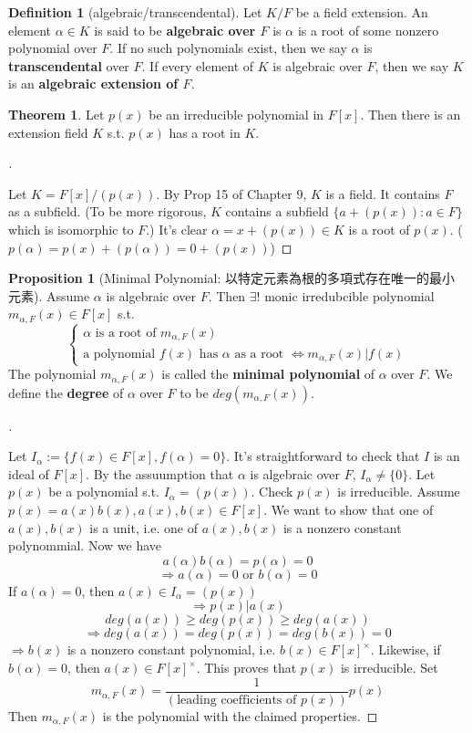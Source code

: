 \documentclass{article}
\theoremstyle{definition}
\newtheorem{thm}{Theorem}
\newtheorem{dfn}{Definition}
\newtheorem{prop}{Proposition}
\newenvironment{proofs}[1][\proofname]{%
  \begin{proof}[#1]$ $\par\nobreak\ignorespaces
}{%
  \end{proof}
}
\begin{document}
\begin{dfn}[algebraic/transcendental]
	Let $K/F$ be a field extension. An element $\alpha \in K$ is said to be \textbf{algebraic over $F$} is $\alpha$ is a root of some nonzero polynomial over $F$.
	If no such polynomials exist, then we say $\alpha$ is \textbf{transcendental} over $F$.
	If every element of $K$ is algebraic over $F$, then we say $K$ is an \textbf{algebraic extension of $F$}.
\end{dfn}

\begin{thm}
	Let $p(x)$ be an irreducible polynomial in $F[x]$. Then there is an extension field $K$ s.t. $p(x)$ has a root in $K$.
\end{thm}

\begin{proofs}
	Let $K = F[x]/(p(x))$.
	By Prop 15 of Chapter 9, $K$ is a field.
	It contains $F$ as a subfield.
	(To be more rigorous, $K$ contains a subfield $\{a + (p(x)): a \in F\}$ which is isomorphic to $F$.)
	It's clear $\alpha = x + (p(x)) \in K$ is a root of $p(x)$.
	($p(\alpha) = p(x) + (p(\alpha)) = 0 + (p(x))$)
\end{proofs}

\begin{prop}[Minimal Polynomial: 以特定元素為根的多項式存在唯一的最小元素]
	Assume $\alpha$ is algebraic over $F$.
	Then $\exists !$ monic irredubcible polynomial $m_{\alpha, F}(x) \in F[x]$ s.t.
	\[
		\begin{cases}
			\alpha \text{ is a root of } m_{\alpha, F}(x) \\
			\text{a polynomial } f(x) \text{ has } \alpha \text{ as a root } \Leftrightarrow m_{\alpha, F}(x) | f(x)
		\end{cases}
	\]
	The polynomial $m_{\alpha, F}(x)$ is called the \textbf{minimal polynomial} of $\alpha$ over $F$.
	We define the \textbf{degree} of $\alpha$ over $F$ to be $deg(m_{\alpha, F}(x))$.
\end{prop}

\begin{proofs}
	Let $I_\alpha := \{f(x) \in F[x], f(\alpha) = 0\}$.
	It's straightforward to check that $I$ is an ideal of $F[x]$.
	By the assuumption that $\alpha$ is algebraic over $F$, $I_\alpha \neq \{0\}$.
	Let $p(x)$ be a polynomial s.t. $I_\alpha = (p(x))$.
	Check $p(x)$ is irreducible.
	Assume $p(x) = a(x) b(x), a(x), b(x) \in F[x]$.
	We want to show that one of $a(x), b(x)$ is a unit, i.e. one of $a(x), b(x)$ is a nonzero constant polynommial.
	Now we have
	\[
		a(\alpha) b(\alpha) = p(\alpha) = 0
	\]
	\[
		\Rightarrow a(\alpha) = 0 \text{ or } b(\alpha) = 0
	\]
	If $a(\alpha) = 0$, then $a(x) \in I_\alpha = (p(x))$
	\[
		\Rightarrow p(x) | a(x)
	\]
	\[
		deg(a(x)) \geq deg(p(x)) \geq deg(a(x))
	\]
	\[
		\Rightarrow deg(a(x)) = deg(p(x)) = deg(b(x)) = 0
	\]
	$\Rightarrow b(x)$ is a nonzero constant polynomial, i.e. $b(x) \in F[x]^\times$.
	Likewise, if $b(\alpha) = 0$, then $a(x) \in F[x]^\times$.
	This proves that $p(x)$ is irreducible.
	Set
	\[
		m_{\alpha, F}(x) = \frac{1}{(\text{leading coefficients of }p(x))} p(x)
	\]
	Then $m_{\alpha, F}(x)$ is the polynomial with the claimed properties.
\end{proofs}
\end{document}
